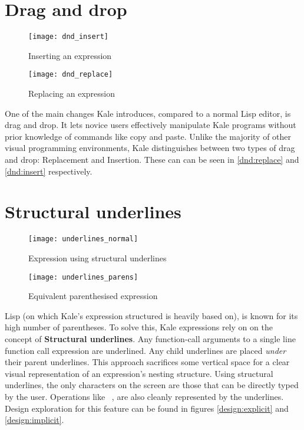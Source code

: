 \section{Drag and drop}
\begin{wrapfigure}[7]{r}{6.5cm}
	\vspace*{-2mm}
	\centering
	\begin{minipage}{3cm}
	\capstart
	\texttt{[image: dnd\_insert]}
	\vspace*{-14mm}
	\caption{\centering Inserting an expression}
	\label{dnd:insert}
	\end{minipage}
	\begin{minipage}{3cm}
	\capstart
	\texttt{[image: dnd\_replace]}
	\vspace*{-14mm}
	\caption{\centering Replacing an expression}
	\label{dnd:replace}
	\end{minipage}
\end{wrapfigure}
One of the main changes Kale introduces, compared to a normal Lisp editor, is
drag and drop. It lets novice users effectively manipulate Kale programs
without prior knowledge of commands like copy and paste. Unlike the majority
of other visual programming environments, Kale distinguishes
between two types of drag and drop: Replacement and Insertion. These can can be
seen in \autoref{dnd:replace} and \autoref{dnd:insert} respectively.

\section{Structural underlines}
\setlength{\columnsep}{25pt}
\begin{wrapfigure}[8]{r}{6.5cm}
	\vspace{-3mm}
	\texttt{[image: underlines\_normal]}
	\vspace{-7mm}
	\caption{Expression using structural underlines}
	\label{underlines:normal}
	\bigskip
	\texttt{[image: underlines\_parens]}
	\vspace{-12mm}
	\caption{Equivalent parenthesised expression}
	\label{underlines:parens}
\end{wrapfigure}
Lisp (on which Kale's expression structured is heavily based on), is known
for its high number of parentheses. To solve this, Kale expressions rely on
on the concept of \textbf{Structural underlines}. Any function-call arguments
to a single line function call expression are underlined. Any child underlines are
placed \emph{under} their parent underlines. This approach sacrifices some
vertical space for a clear visual representation of an expression's nesting
structure. Using structural underlines, the only characters on the screen are
those that can be directly typed by the user. Operations like
\hyperref[cmd:move_up]{}~, are also cleanly
represented by the underlines. Design exploration for this feature can be
found in figures
\ref{design:explicit} and \ref{design:implicit}.

